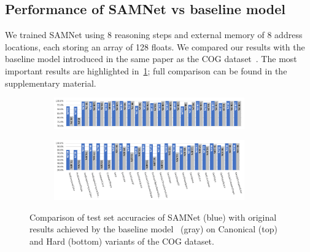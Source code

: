 \subsection{Performance of SAMNet vs baseline model~\cite{yang2018dataset}}
\label{sec:cog-baseline-compare}

We trained SAMNet using 8 reasoning steps and external memory of 8 address locations, each storing an array of 128 floats. 
We compared our results with the baseline model introduced in the same paper as the COG dataset~\cite{yang2018dataset}.
The most important results are highlighted in~\cref{fig:samnet_cog_detailed}; full comparison can be found in the supplementary material.%

\begin{figure}[htb]
	\centering
	\begin{subfigure}{\textwidth}
		\centering
		\includegraphics[width=0.9\textwidth]{img/results/samnet_cog_orig_canonical_no_labels.png}
	\end{subfigure}%
	\newline
	\begin{subfigure}{\textwidth}
		\centering
		\includegraphics[width=0.9\textwidth]{img/results/samnet_cog_orig_hard.png}
	\end{subfigure}%
	\caption{Comparison of test set accuracies of SAMNet (blue) with original results achieved by the 
		baseline model~\cite{yang2018dataset} (gray) on Canonical (top) and Hard (bottom) variants of the COG dataset.}
	\label{fig:samnet_cog_detailed}
\end{figure}

